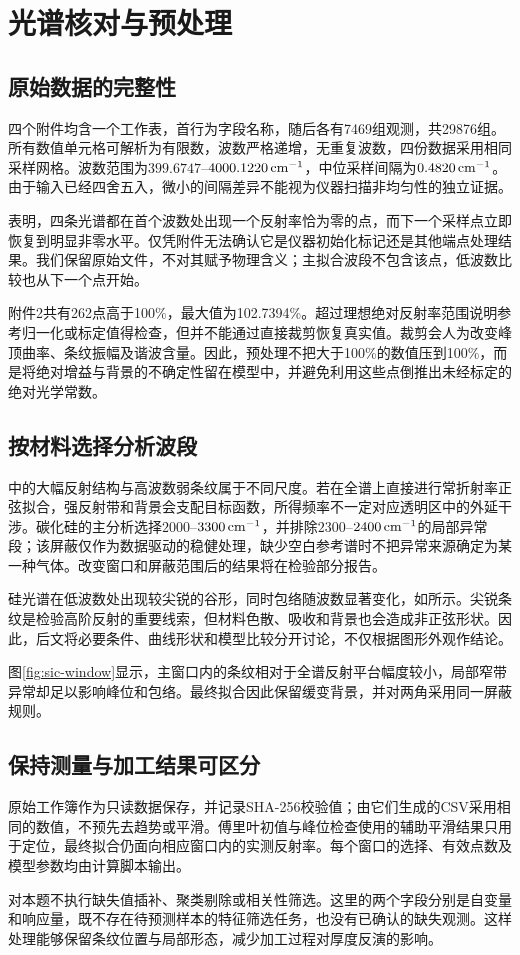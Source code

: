 \section{光谱核对与预处理}
\subsection{原始数据的完整性}
四个附件均含一个工作表，首行为字段名称，随后各有7469组观测，共29876组。所有数值单元格可解析为有限数，波数严格递增，无重复波数，四份数据采用相同采样网格。波数范围为$399.6747$--$4000.1220\,\mathrm{cm}^{-1}$，中位采样间隔为$0.4820\,\mathrm{cm}^{-1}$。由于输入已经四舍五入，微小的间隔差异不能视为仪器扫描非均匀性的独立证据。


表明，四条光谱都在首个波数处出现一个反射率恰为零的点，而下一个采样点立即恢复到明显非零水平。仅凭附件无法确认它是仪器初始化标记还是其他端点处理结果。我们保留原始文件，不对其赋予物理含义；主拟合波段不包含该点，低波数比较也从下一个点开始。

附件2共有262点高于100\%，最大值为102.7394\%。超过理想绝对反射率范围说明参考归一化或标定值得检查，但并不能通过直接裁剪恢复真实值。裁剪会人为改变峰顶曲率、条纹振幅及谐波含量。因此，预处理不把大于100\%的数值压到100\%，而是将绝对增益与背景的不确定性留在模型中，并避免利用这些点倒推出未经标定的绝对光学常数。

\subsection{按材料选择分析波段}
中的大幅反射结构与高波数弱条纹属于不同尺度。若在全谱上直接进行常折射率正弦拟合，强反射带和背景会支配目标函数，所得频率不一定对应透明区中的外延干涉。碳化硅的主分析选择$2000$--$3300\,\mathrm{cm}^{-1}$，并排除$2300$--$2400\,\mathrm{cm}^{-1}$的局部异常段；该屏蔽仅作为数据驱动的稳健处理，缺少空白参考谱时不把异常来源确定为某一种气体。改变窗口和屏蔽范围后的结果将在检验部分报告。

硅光谱在低波数处出现较尖锐的谷形，同时包络随波数显著变化，如所示。尖锐条纹是检验高阶反射的重要线索，但材料色散、吸收和背景也会造成非正弦形状。因此，后文将必要条件、曲线形状和模型比较分开讨论，不仅根据图形外观作结论。

图\ref{fig:sic-window}显示，主窗口内的条纹相对于全谱反射平台幅度较小，局部窄带异常却足以影响峰位和包络。最终拟合因此保留缓变背景，并对两角采用同一屏蔽规则。
\subsection{保持测量与加工结果可区分}
原始工作簿作为只读数据保存，并记录SHA-256校验值；由它们生成的CSV采用相同的数值，不预先去趋势或平滑。傅里叶初值与峰位检查使用的辅助平滑结果只用于定位，最终拟合仍面向相应窗口内的实测反射率。每个窗口的选择、有效点数及模型参数均由计算脚本输出。

对本题不执行缺失值插补、聚类剔除或相关性筛选。这里的两个字段分别是自变量和响应量，既不存在待预测样本的特征筛选任务，也没有已确认的缺失观测。这样处理能够保留条纹位置与局部形态，减少加工过程对厚度反演的影响。
